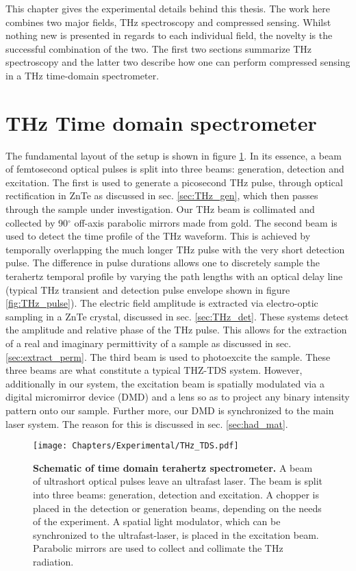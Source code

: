 This chapter gives the experimental details behind this thesis. The work here combines two major fields, THz spectroscopy and compressed sensing. Whilst nothing new is presented in regards to each individual field, the novelty is the successful combination of the two. The first two sections summarize THz spectroscopy and the latter two describe how one can perform compressed sensing in a THz time-domain spectrometer.   


\section{THz Time domain spectrometer}\label{sec:THz_TDS}
The fundamental layout of the setup is shown in figure \ref{fig:THz_TDS}. In its essence, a beam of femtosecond optical pulses is split into three beams: generation, detection and excitation. The first is used to generate a picosecond THz pulse, through optical rectification in ZnTe as discussed in sec. \ref{sec:THz_gen}, which then passes through the sample under investigation. Our THz beam is collimated and collected by 90$^\circ$ off-axis parabolic mirrors made from gold. The second beam is used to detect the time profile of the THz waveform. This is achieved by temporally overlapping the much longer THz pulse with the very short detection pulse. The difference in pulse durations allows one to discretely sample the terahertz temporal profile by varying the path lengths with an optical delay line (typical THz transient and detection pulse envelope shown in figure \ref{fig:THz_pulse}). The electric field amplitude is extracted via electro-optic sampling in a ZnTe crystal, discussed in sec. \ref{sec:THz_det}. These systems detect the amplitude and relative phase of the THz pulse. This allows for the extraction of a real and imaginary permittivity of a sample as discussed in sec. \ref{sec:extract_perm}. The third beam is used to photoexcite the sample. These three beams are what constitute a typical THZ-TDS system. However, additionally in our system, the excitation beam is spatially modulated via a digital micromirror device (DMD) and a lens so as to project any binary intensity pattern onto our sample. Further more, our DMD is synchronized to the main laser system. The reason for this is discussed in sec. \ref{sec:had_mat}.
\begin{figure}[h!]\centering
\texttt{[image: Chapters/Experimental/THz\_TDS.pdf]}
\caption{\textbf{Schematic of time domain terahertz
spectrometer.} A beam of ultrashort optical pulses leave an ultrafast laser. The beam is split into three beams: generation, detection and
excitation. A chopper is placed in the detection or generation beams,
depending on the needs of the experiment. A spatial light modulator, which can be synchronized to the ultrafast-laser, is placed in the excitation beam. Parabolic mirrors are used to collect and collimate the THz radiation.}
\label{fig:THz_TDS}
\end{figure}

